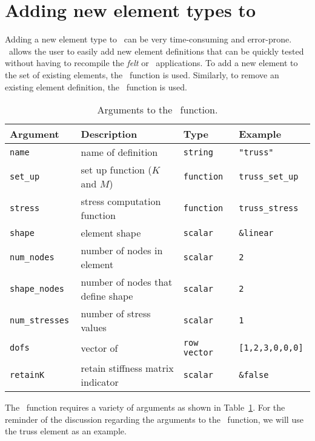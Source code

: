 \section{Adding new element types to \burlap}
\label{burlap.adding-elements}

Adding a new element type to \felt\ can be very time-consuming and
error-prone.  \burlap\ allows the user to easily add new element
definitions that can be quickly tested without having to recompile the
{\em felt} or \velvet\ applications.  To add a new element to the set
of existing elements, the \adddef\ function is used.  Similarly, to
remove an existing element definition, the \remdef\ function is used.

\begin{table}[htbp]
\begin{center}
\begin{tabular}{l|l|l|l}
Argument	  & Description			      & Type	       & Example	    \\
\hline
\tt name	  & name of definition		      & \tt string     & \tt "truss"	    \\
\tt set\_up	  & set up function ($K$ and $M$)     & \tt function   & \tt truss\_set\_up \\
\tt stress	  & stress computation function	      & \tt function   & \tt truss\_stress  \\
\tt shape	  & element shape		      & \tt scalar     & \tt \&linear	    \\
\tt num\_nodes	  & number of nodes in element	      & \tt scalar     & \tt 2		    \\
\tt shape\_nodes  & number of nodes that define shape & \tt scalar     & \tt 2		    \\
\tt num\_stresses & number of stress values	      & \tt scalar     & \tt 1		    \\
\tt dofs	  & vector of \dofs		      & \tt row vector & \tt [1,2,3,0,0,0]  \\
\tt retainK	  & retain stiffness matrix indicator & \tt scalar     & \tt \&false	    \\
\end{tabular}
\caption{Arguments to the \adddef\ function.}
\label{burlap.adddef.arguments}
\end{center}
\end{table}

The \adddef\ function requires a variety of arguments as shown in
Table~\ref{burlap.adddef.arguments}.  For the reminder of the
discussion regarding the arguments to the \adddef\ function, we will
use the truss element as an example.

